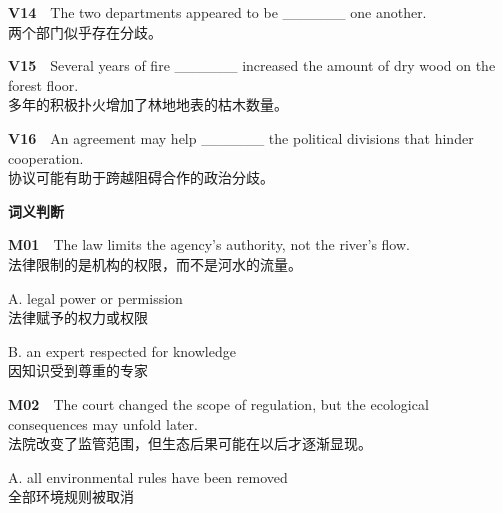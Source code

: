 \documentclass[a4paper,11pt,openany]{report}
\newcommand{\zhline}[1]{{\CJKsf\color{bodygrey}#1}}
\begin{document}
\begin{samepage}
\textbf{V14}　The two departments appeared to be \_\_\_\_\_\_ one another.\\
\zhline{两个部门似乎存在分歧。}
\par\end{samepage}

\begin{samepage}
\textbf{V15}　Several years of fire \_\_\_\_\_\_ increased the amount of dry wood on the forest floor.\\
\zhline{多年的积极扑火增加了林地地表的枯木数量。}
\par\end{samepage}

\begin{samepage}
\textbf{V16}　An agreement may help \_\_\_\_\_\_ the political divisions that hinder cooperation.\\
\zhline{协议可能有助于跨越阻碍合作的政治分歧。}
\par\end{samepage}

\textbf{词义判断}

\begin{samepage}
\textbf{M01}　The law limits the agency's authority, not the river's flow.\\
\zhline{法律限制的是机构的权限，而不是河水的流量。}
\par\end{samepage}

\begin{samepage}
A. legal power or permission\\
\zhline{法律赋予的权力或权限}
\par\end{samepage}

\begin{samepage}
B. an expert respected for knowledge\\
\zhline{因知识受到尊重的专家}
\par\end{samepage}

\begin{samepage}
\textbf{M02}　The court changed the scope of regulation, but the ecological consequences may unfold later.\\
\zhline{法院改变了监管范围，但生态后果可能在以后才逐渐显现。}
\par\end{samepage}

\begin{samepage}
A. all environmental rules have been removed\\
\zhline{全部环境规则被取消}
\par\end{samepage}
\end{document}
